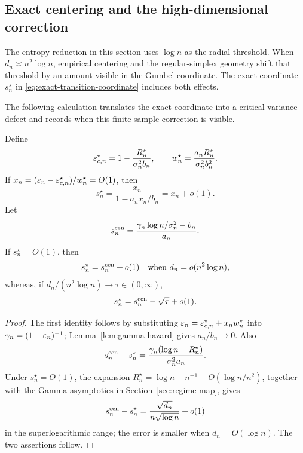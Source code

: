 \subsection{Exact centering and the high-dimensional correction}
\label{sec:full-growing-transition}

The entropy reduction in this section uses \(\log n\) as the radial
threshold. When \(d_n\asymp n^2\log n\), empirical centering and the
regular-simplex geometry shift that threshold by an amount visible in the
Gumbel coordinate. The exact coordinate \(s_n^\star\) in
\eqref{eq:exact-transition-coordinate} includes both effects.

The following calculation translates the exact coordinate into a critical
variance defect and records when this finite-sample correction is visible.
\begin{lemma}
\label{lem:exact-critical-coordinate}
Define
\begin{equation}
\label{eq:exact-critical-defect-window}
 \varepsilon_{c,n}^\star
 =1-\frac{R_n^\star}{\sigma_n^2b_n},
 \qquad
 w_n^\star
 =\frac{a_nR_n^\star}{\sigma_n^2b_n^2}.
\end{equation}
If \(x_n=(\varepsilon_n-\varepsilon_{c,n}^\star)/w_n^\star=O(1)\), then
\[
 s_n^\star=\frac{x_n}{1-a_nx_n/b_n}=x_n+o(1).
\]
Let
\[
 s_n^{\rm cen}
 =\frac{\gamma_n\log n/\sigma_n^2-b_n}{a_n}.
\]
If \(s_n^\star=O(1)\), then
\[
 s_n^\star=s_n^{\rm cen}+o(1)
 \quad\text{when }d_n=o(n^2\log n),
\]
whereas, if \(d_n/(n^2\log n)\to\tau\in(0,\infty)\),
\begin{equation}
\label{eq:terminal-coordinate-shift}
 s_n^\star=s_n^{\rm cen}-\sqrt{\tau}+o(1).
\end{equation}
\end{lemma}

\begin{proof}
The first identity follows by substituting
\(\varepsilon_n=\varepsilon_{c,n}^\star+x_nw_n^\star\) into
\(\gamma_n=(1-\varepsilon_n)^{-1}\); Lemma~\ref{lem:gamma-hazard} gives
\(a_n/b_n\to0\).  Also
\[
 s_n^{\rm cen}-s_n^\star
 =\frac{\gamma_n(\log n-R_n^\star)}
        {\sigma_n^2a_n}.
\]
Under \(s_n^\star=O(1)\), the expansion
\(R_n^\star=\log n-n^{-1}+O(\log n/n^2)\), together with the Gamma
asymptotics in Section~\ref{sec:regime-map}, gives
\[
 s_n^{\rm cen}-s_n^\star
 =\frac{\sqrt{d_n}}{n\sqrt{\log n}}+o(1)
\]
in the superlogarithmic range; the error is smaller when
\(d_n=O(\log n)\).  The two assertions follow.
\end{proof}
